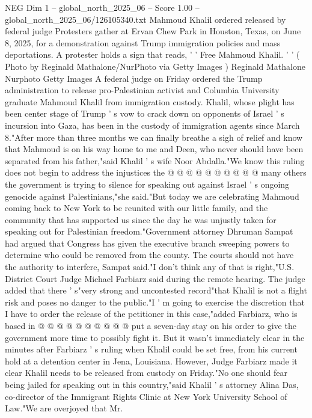 \begin{textsample}{NEG Dim 1 – global\_north\_2025\_06 – Score 1.00 – global\_north\_2025\_06/126105340.txt}  \label{ex:f1_neg_147}
Mahmoud Khalil ordered released by federal judge Protesters gather at Ervan Chew Park in Houston, Texas, on June 8, 2025, for a demonstration against Trump immigration policies and mass deportations.
A protester holds a sign that reads, ' ' Free Mahmoud Khalil. ' ' ( Photo by Reginald Mathalone/NurPhoto via Getty Images ) Reginald Mathalone Nurphoto Getty Images A federal judge on Friday ordered the Trump administration to release pro-Palestinian activist and Columbia University graduate Mahmoud Khalil from immigration custody.
Khalil, whose plight has been center stage of Trump ' s vow to crack down on opponents of Israel ' s incursion into Gaza, has been in the custody of immigration agents since March 8."After more than three months we can finally breathe a sigh of relief and know that Mahmoud is on his way home to me and Deen, who never should have been separated from his father,"said Khalil ' s wife Noor Abdalla."We know this ruling does not begin to address the injustices the @ @ @ @ @ @ @ @ @ @ many others the government is trying to silence for speaking out against Israel ' s ongoing genocide against Palestinians,"she said."But today we are celebrating Mahmoud coming back to New York to be reunited with our little family, and the community that has supported us since the day he was unjustly taken for speaking out for Palestinian freedom."Government attorney Dhruman Sampat had argued that Congress has given the executive branch sweeping powers to determine who could be removed from the county.
The courts should not have the authority to interfere, Sampat said."I don't think any of that is right,"U.S.
District Court Judge Michael Farbiarz said during the remote hearing.
The judge added that there ' s"very strong and uncontested record"that Khalil is not a flight risk and poses no danger to the public."I ' m going to exercise the discretion that I have to order the release of the petitioner in this case,"added Farbiarz, who is based in @ @ @ @ @ @ @ @ @ @ put a seven-day stay on his order to give the government more time to possibly fight it.
But it wasn't immediately clear in the minutes after Farbiarz ' s ruling when Khalil could be set free, from his current hold at a detention center in Jena, Louisiana.
However, Judge Farbiarz made it clear Khalil needs to be released from custody on Friday."No one should fear being jailed for speaking out in this country,"said Khalil ' s attorney Alina Das, co-director of the Immigrant Rights Clinic at New York University School of Law."We are overjoyed that Mr.

\end{textsample}
